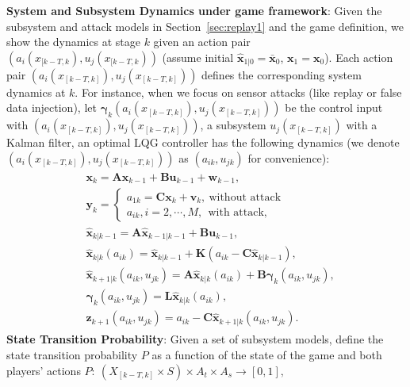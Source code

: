 \textbf{System and Subsystem Dynamics under game framework}: Given the subsystem and attack models in Section~\ref{sec:replay1} and the game definition,  
we show the dynamics at stage $k$ given an action pair $(a_{i}(x_{[k-T,k}),u_{j}(x_{[k-T,k}))$ (assume initial $\mathbf{\hat{x}}_{1|0}=\bar{\mathbf{x}}_{0}$, $\mathbf{x}_{1}=\mathbf{x}_{0}$). Each action pair $(a_{i}(x_{[k-T,k]}),u_{j}(x_{[k-T,k]}))$ defines the corresponding system dynamics at $k$. For instance, when we focus on sensor attacks (like replay or false data injection), let $\mathbf{\gamma}_{k}(a_{i}(x_{[k-T,k]}), u_{j}(x_{[k-T,k]}))$ be the control input with $(a_{i}(x_{[k-T,k]}),u_{j}(x_{[k-T,k]}))$, a subsystem $u_{j}(x_{[k-T,k]})$ with a Kalman filter, an optimal LQG controller has the following dynamics (we denote $(a_{i}(x_{[k-T,k]}),u_{j}(x_{[k-T,k]}))$ as $(a_{ik}, u_{jk})$ for convenience): 
\begin{align}
\begin{split}
&\mathbf{x}_{k}=\mathbf{Ax}_{k-1}+ \mathbf{Bu}_{k-1}+\mathbf{w}_{k-1},\\
& \mathbf{y}_{k}=\begin{cases}a_{1k} = \mathbf{Cx}_k+\mathbf{v}_{k},\ \text{without attack}\\
a_{ik}, i=2,\cdots, M, \ \ \text{with attack,} \end{cases}\\
&\hat{\mathbf{x}}_{k|k-1}= \mathbf{A\hat{x}}_{k-1|k-1}+\mathbf{Bu}_{k-1},\\
&\hat{\mathbf{x}}_{k|k}(a_{ik}) =\hat{\mathbf{x}}_{k|k-1}+ \mathbf{K}(a_{ik} - \mathbf{C\hat{x}}_{k|k-1}),\\
&\mathbf{\hat{x}}_{k+1|k}(a_{ik},u_{jk})=\mathbf{A\hat{x}}_{k|k}(a_{ik})+\mathbf{B\gamma}_{k}(a_{ik},u_{jk}),\\
& \mathbf{\gamma}_{k}(a_{ik}, u_{jk}) = \mathbf{L\hat{x}}_{k|k} (a_{ik}),\\%
&\mathbf{z}_{k+1}(a_{ik},u_{jk})=a_{ik} - \mathbf{C\hat{x}}_{k+1|k}(a_{ik},u_{jk}).
\label{dynamicgame}
\end{split}
\end{align}
\textbf{State Transition Probability}: Given a set of subsystem models, define the state transition probability $P$ as a function of the state of the game and both players' actions $P:\ (X_{[k-T,k]}\times S) \times A_{t} \times A_{s}\to [0, 1],$
